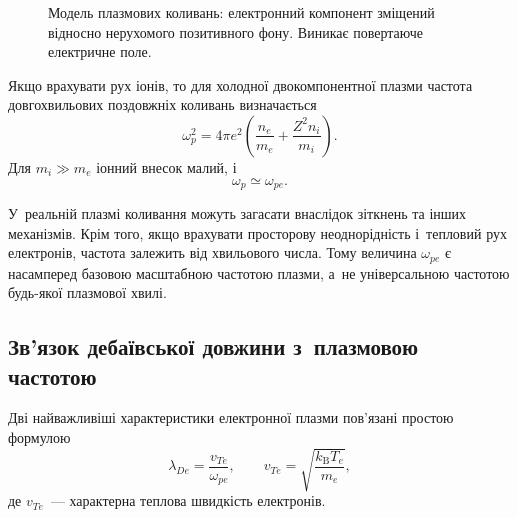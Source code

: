 \begin{figure}[htbp]\centering
	\begin{subfigure}[t]{0.5\linewidth}\centering
	\end{subfigure}%
	\begin{subfigure}[t]{0.5\linewidth}\centering
	\end{subfigure}
	\caption{Модель плазмових коливань: електронний компонент зміщений відносно нерухомого позитивного фону. Виникає повертаюче електричне поле.}\label{fig:plasma-oscillation}
\end{figure}

Якщо врахувати рух іонів, то для холодної двокомпонентної плазми частота довгохвильових поздовжніх коливань визначається
\begin{equation}
	\omega_p^2
	=4\pi e^2\left(
	\frac{n_e}{m_e}+\frac{Z^2n_i}{m_i}\right).
\end{equation}
Для $m_i\gg m_e$ іонний внесок малий, і
\begin{equation*}
	\omega_p\simeq\omega_{pe}.
\end{equation*}

У~реальній плазмі коливання можуть загасати внаслідок зіткнень та інших механізмів. Крім того, якщо врахувати просторову неоднорідність і~тепловий рух електронів, частота залежить від хвильового числа. Тому величина $\omega_{pe}$ є насамперед базовою масштабною частотою плазми, а~не універсальною частотою будь-якої плазмової хвилі.



\subsection{Зв'язок дебаївської довжини з~плазмовою частотою}



Дві найважливіші характеристики електронної плазми пов'язані простою формулою
\begin{equation}
	\lambda_{De}
	=\frac{v_{Te}}{\omega_{pe}},
	\qquad
	v_{Te}=\sqrt{\frac{k_{\mathrm B}T_e}{m_e}},
\end{equation}
де $v_{Te}$~--- характерна теплова швидкість електронів.

